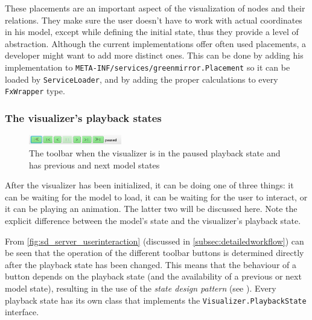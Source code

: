 \documentclass[a4paper]{article}
\begin{document}
These placements are an important aspect of the visualization of nodes and their relations. They make sure the user doesn't have to work with actual coordinates in his model, except while defining the initial state, thus they provide a level of abstraction. Although the current implementations offer often used placements, a developer might want to add more distinct ones. This can be done by adding his implementation to \lstinline{META-INF/services/greenmirror.Placement} so it can be loaded by \lstinline{ServiceLoader}, and by adding the proper calculations to every \lstinline{FxWrapper} type.

\subsubsection{The visualizer's playback states}\label{subsubsec:playbackstates}
\begin{figure}\vspace{-12pt}
  \begin{center}
    \includegraphics[width=0.36\textwidth]{images/toolbar_paused_withsiblingstates}
  \end{center}
  \vspace{-10pt}\caption{The toolbar when the visualizer is in the paused playback state and has previous and next model states}\vspace{-12pt}
  \label{fig:toolbar}
\end{figure}

After the visualizer has been initialized, it can be doing one of three things: it can be waiting for the model to load, it can be waiting for the user to interact, or it can be playing an animation. The latter two will be discussed here. Note the explicit difference between the model's state and the visualizer's playback state.

From \cref{fig:sd_server_userinteraction} (discussed in \cref{subsec:detailedworkflow}) can be seen that the operation of the different toolbar buttons is determined directly after the playback state has been changed. This means that the behaviour of a button depends on the playback state (and the availability of a previous or next model state), resulting in the use of the \emph{state design pattern} (see \cite{kuchana2004,sourcemaking}). Every playback state has its own class that implements the \lstinline{Visualizer.PlaybackState} interface.
\end{document}
